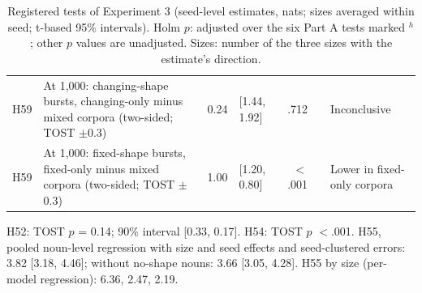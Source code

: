 \begin{table}[!htbp]
\begin{tabular}{@{}l>{\raggedright\arraybackslash}p{}rlrc>{\raggedright\arraybackslash}p{}@{}}
H59 & At 1,000: changing-shape bursts, changing-only minus mixed corpora (two-sided; TOST $\pm$0.3) & 0.24 & [\textminus{}1.44, 1.92] & .712 &  & Inconclusive \\
H59 & At 1,000: fixed-shape bursts, fixed-only minus mixed corpora (two-sided; TOST $\pm$0.3) & \textminus{}1.00 & [\textminus{}1.20, \textminus{}0.80] & $<$.001 &  & Lower in fixed-only corpora \\
\bottomrule
\end{tabular}
\par\smallskip\parbox{\textwidth}{\footnotesize H52: TOST $p$ = 0.14; 90\% interval [\textminus{}0.33, \textminus{}0.17]. H54: TOST $p$ $<$.001. H55, pooled noun-level regression with size and seed effects and seed-clustered errors: 3.82 [3.18, 4.46]; without no-shape nouns: 3.66 [3.05, 4.28]. H55 by size (per-model regression): 6.36, 2.47, 2.19.}
\caption{Registered tests of Experiment 3 (seed-level estimates, nats; sizes averaged within seed; t-based 95\% intervals). Holm $p$: adjusted over the six Part A tests marked $^h$; other $p$ values are unadjusted. Sizes: number of the three sizes with the estimate's direction.}
\label{tab:O1}
\end{table}

\begin{table}[!htbp]
\centering\small


\caption{Experiment 3, mixed design, 1,000 exposures: copy score when the context sentence is about a noun of one history (rows) and the query names a different noun of the same or another history (columns); means over ten seeds, sizes averaged (24 items per pair and model). Every item names a different noun in the query, so the diagonal is not comparable with the same-noun copy scores of Table~\ref{tab:O2}.}
\label{tab:O3}
\end{table}

